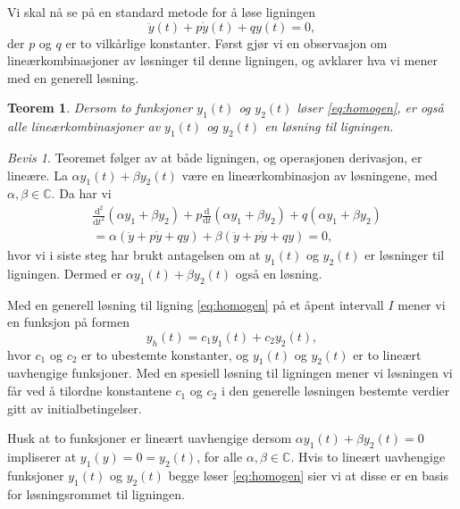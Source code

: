 \documentclass{article}
\newtheorem{thm}{Teorem}\surroundwithmdframed{thm}
\theoremstyle{definition}
\newenvironment{defn}
{\pushQED{\qed}\renewcommand{\qedsymbol}{$\triangle$}\defnx}
{\popQED\enddefnx}
\theoremstyle{remark}
\newtheorem*{bevis}{Bevis}
\begin{document}
\begin{multicols*}{2}
Vi skal nå se på en standard metode for å løse ligningen
\begin{equation} \label{eq:homogen}
    \ddot{y}(t) + p \dot{y}(t) + q y(t) = 0,
\end{equation}
der $p$ og $q$ er to vilkårlige konstanter. Først gjør vi en observasjon om lineærkombinasjoner av løsninger til denne ligningen, og avklarer hva vi mener med en generell løsning.

\begin{thm} \label{thm:lin_komb_losning}
  Dersom to funksjoner $y_1(t)$ og $y_2(t)$ løser \eqref{eq:homogen}, er også alle lineærkombinasjoner av $y_1(t)$ og $y_2(t)$ en løsning til ligningen.
\end{thm}

\begin{bevis}
  Teoremet følger av at både ligningen, og operasjonen derivasjon, er lineære. La $\alpha y_1(t) + \beta y_2(t)$ være en lineærkombinasjon av løsningene, med $\alpha, \beta \in \mathbb{C}$. Da har vi
  \begin{equation*}
    \begin{split}
      & \frac{\mathrm{d}^2}{\mathrm{d} t^2}(\alpha y_1 + \beta y_2) + p \frac{\mathrm{d}}{\mathrm{d} t} (\alpha y_1 + \beta y_2) + q (\alpha y_1 + \beta y_2) \\
      & = \alpha (\ddot{y} + p \dot{y} + q y) + \beta (\ddot{y} + p \dot{y} + q y) = 0,
    \end{split}
  \end{equation*}
  hvor vi i siste steg har brukt antagelsen om at $y_1(t)$ og $y_2(t)$ er løsninger til ligningen. Dermed er $\alpha y_1(t) + \beta y_2(t)$ også en løsning.
\end{bevis}

\begin{defn}
    Med en generell løsning til ligning \eqref{eq:homogen} på et åpent intervall $I$ mener vi en funksjon på formen
    \begin{equation*}
      y_h(t) = c_1 y_1(t) + c_2 y_2(t),
    \end{equation*}
    hvor $c_1$ og $c_2$ er to ubestemte konstanter, og $y_1(t)$ og $y_2(t)$ er to lineært uavhengige funksjoner. Med en spesiell løsning til ligningen mener vi løsningen vi får ved å tilordne konstantene $c_1$ og $c_2$ i den generelle løsningen bestemte verdier gitt av initialbetingelser.
\end{defn}

Husk at to funksjoner er lineært uavhengige dersom $\alpha y_1(t) + \beta y_2(t) = 0$ impliserer at $y_1(y) = 0 = y_2(t)$, for alle $\alpha, \beta \in \mathbb{C}$. Hvis to lineært uavhengige funksjoner $y_1(t)$ og $y_2(t)$ begge løser \eqref{eq:homogen} sier vi at disse er en basis for løsningsrommet til ligningen.


\end{multicols*}
\end{document}
